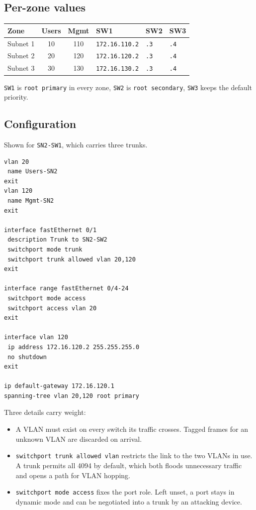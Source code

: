 \documentclass[12pt,a4paper]{article}
\begin{document}
\subsection{Per-zone values}

\begin{table}[H]
\centering
\begin{tabular}{@{} l c c l l l @{}}
\toprule
\textbf{Zone} & \textbf{Users} & \textbf{Mgmt} & \textbf{SW1} & \textbf{SW2} & \textbf{SW3} \\
\midrule
Subnet 1 & 10 & 110 & \texttt{172.16.110.2} & \texttt{.3} & \texttt{.4} \\
Subnet 2 & 20 & 120 & \texttt{172.16.120.2} & \texttt{.3} & \texttt{.4} \\
Subnet 3 & 30 & 130 & \texttt{172.16.130.2} & \texttt{.3} & \texttt{.4} \\
\bottomrule
\end{tabular}
\end{table}

\texttt{SW1} is \texttt{root primary} in every zone, \texttt{SW2} is
\texttt{root secondary}, \texttt{SW3} keeps the default priority.

\subsection{Configuration}

Shown for \texttt{SN2-SW1}, which carries three trunks.

\begin{lstlisting}
vlan 20
 name Users-SN2
exit
vlan 120
 name Mgmt-SN2
exit

interface fastEthernet 0/1
 description Trunk to SN2-SW2
 switchport mode trunk
 switchport trunk allowed vlan 20,120
exit

interface range fastEthernet 0/4-24
 switchport mode access
 switchport access vlan 20
exit

interface vlan 120
 ip address 172.16.120.2 255.255.255.0
 no shutdown
exit

ip default-gateway 172.16.120.1
spanning-tree vlan 20,120 root primary
\end{lstlisting}

Three details carry weight:

\begin{itemize}[nosep]
  \item A VLAN must exist on every switch its traffic crosses. Tagged frames for
        an unknown VLAN are discarded on arrival.
  \item \texttt{switchport trunk allowed vlan} restricts the link to the two
        VLANs in use. A trunk permits all 4094 by default, which both floods
        unnecessary traffic and opens a path for VLAN hopping.
  \item \texttt{switchport mode access} fixes the port role. Left unset, a port
        stays in dynamic mode and can be negotiated into a trunk by an attacking
        device.
\end{itemize}
\end{document}
